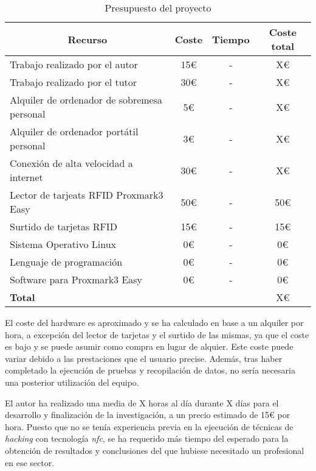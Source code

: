\begin{table}[h]
    \centering
    \caption{Presupuesto del proyecto}
    \begin{adjustbox}{max width=\textwidth}
        \begin{tabular}{| l | c | c | c |}
            \hline 
            \multicolumn{1}{|c|}{\textbf{Recurso}}          & \textbf{Coste}    & \textbf{Tiempo}   & \textbf{Coste total} \\ 
            \hline
            Trabajo realizado por el autor                  & 15€               & -                 & X€ \\ 
            Trabajo realizado por el tutor                  & 30€               & -                 & X€ \\
            Alquiler de ordenador de sobremesa personal     & 5€                & -                 & X€ \\
            Alquiler de ordenador portátil personal         & 3€                & -                 & X€ \\
            Conexión de alta velocidad a internet           & 30€               & -                 & X€ \\
            Lector de tarjeats RFID Proxmark3 Easy          & 50€               & -                 & 50€ \\
            Surtido de tarjetas RFID                        & 15€               & -                 & 15€ \\
            Sistema Operativo Linux                         & 0€                & -                 & 0€ \\
            Lenguaje de programación                        & 0€                & -                 & 0€ \\ 
            Software para Proxmark3 Easy                    & 0€                & -                 & 0€ \\ 
            \hline
            \multicolumn{1}{|l}{\textbf{Total}}      & \multicolumn{2}{c}{}                         & X€ \\ 
            \hline
        \end{tabular}
    \end{adjustbox}
    \label{tab:presupuesto}
\end{table}

El coste del hardware es aproximado y se ha calculado en base a un alquiler por hora, a excepción del lector de
tarjetas y el surtido de las mismas, ya que el coste es bajo y se puede asumir como compra en lugar de alquier.
Este coste puede variar debido a las prestaciones que el usuario precise. Además, tras haber completado la ejecución 
de pruebas y recopilación de datos, no sería necesaria una posterior utilización del equipo. \newline

El autor ha realizado una media de X horas al día durante X días para el desarrollo y finalización de la investigación,
a un precio estimado de 15€ por hora. Puesto que no se tenía experiencia previa en la ejecución de técnicas de
\textit{hacking} con tecnología \textit{\acrshort{nfc}}, se ha requerido más tiempo del esperado para la obtención de 
resultados y conclusiones del que hubiese necesitado un profesional en ese sector.


